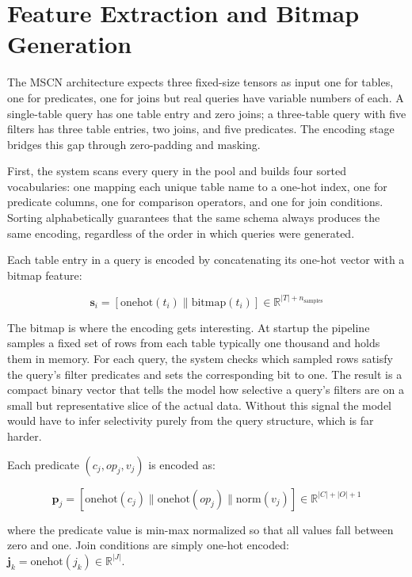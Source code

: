 \section{Feature Extraction and Bitmap Generation}

The MSCN architecture expects three fixed-size tensors as input one for tables, one for predicates, one for joins but real queries have variable numbers of each. A single-table query has one table entry and zero joins; a three-table query with five filters has three table entries, two joins, and five predicates. The encoding stage bridges this gap through zero-padding and masking.

First, the system scans every query in the pool and builds four sorted vocabularies: one mapping each unique table name to a one-hot index, one for predicate columns, one for comparison operators, and one for join conditions. Sorting alphabetically guarantees that the same schema always produces the same encoding, regardless of the order in which queries were generated.

Each table entry in a query is encoded by concatenating its one-hot vector with a bitmap feature:

\begin{equation}
\mathbf{s}_i = [\text{onehot}(t_i) \| \text{bitmap}(t_i)] \in \mathbb{R}^{|T| + n_{\text{samples}}}
\end{equation}

The bitmap is where the encoding gets interesting. At startup the pipeline samples a fixed set of rows from each table typically one thousand and holds them in memory. For each query, the system checks which sampled rows satisfy the query's filter predicates and sets the corresponding bit to one. The result is a compact binary vector that tells the model how selective a query's filters are on a small but representative slice of the actual data. Without this signal the model would have to infer selectivity purely from the query structure, which is far harder.

Each predicate $(c_j, op_j, v_j)$ is encoded as:

\begin{equation}
\mathbf{p}_j = [\text{onehot}(c_j) \| \text{onehot}(op_j) \| \text{norm}(v_j)] \in \mathbb{R}^{|C| + |O| + 1}
\end{equation}

where the predicate value is min-max normalized so that all values fall between zero and one. Join conditions are simply one-hot encoded: $\mathbf{j}_k = \text{onehot}(j_k) \in \mathbb{R}^{|J|}$.

